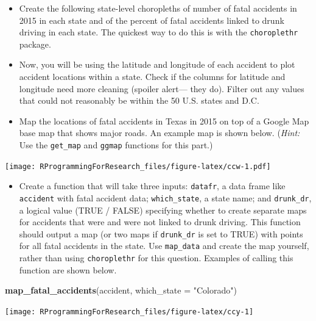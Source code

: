 \documentclass[]{book}
\makeatletter
\newenvironment{Shaded}{\begin{snugshade}}{\end{snugshade}}
\newcommand{\KeywordTok}[1]{\textcolor[rgb]{0.13,0.29,0.53}{\textbf{#1}}}
\newcommand{\DataTypeTok}[1]{\textcolor[rgb]{0.13,0.29,0.53}{#1}}
\newcommand{\StringTok}[1]{\textcolor[rgb]{0.31,0.60,0.02}{#1}}
\newcommand{\NormalTok}[1]{#1}
\providecommand{\tightlist}{%
  \setlength{\itemsep}{0pt}\setlength{\parskip}{0pt}}
\newenvironment{kframe}{%
\medskip{}
\setlength{\fboxsep}{.8em}
 \def\at@end@of@kframe{}%
 \ifinner\ifhmode%
  \def\at@end@of@kframe{\end{minipage}}%
  \begin{minipage}{\columnwidth}%
 \fi\fi%
 \def\FrameCommand##1{\hskip\@totalleftmargin \hskip-\fboxsep
 \colorbox{shadecolor}{##1}\hskip-\fboxsep
     \hskip-\linewidth \hskip-\@totalleftmargin \hskip\columnwidth}%
 \MakeFramed {\advance\hsize-\width
   \@totalleftmargin\z@ \linewidth\hsize
   \@setminipage}}%
 {\par\unskip\endMakeFramed%
 \at@end@of@kframe}
\renewenvironment{Shaded}{\begin{kframe}}{\end{kframe}}
\theoremstyle{definition}
\theoremstyle{definition}
\theoremstyle{definition}
\theoremstyle{remark}
\makeatother
\begin{document}
\begin{itemize}
\item
  Create the following state-level choropleths of number of fatal
  accidents in 2015 in each state and of the percent of fatal accidents
  linked to drunk driving in each state. The quickest way to do this is
  with the \texttt{choroplethr} package.
\item
  Now, you will be using the latitude and longitude of each accident to
  plot accident locations within a state. Check if the columns for
  latitude and longitude need more cleaning (spoiler alert--- they do).
  Filter out any values that could not reasonably be within the 50 U.S.
  states and D.C.
\item
  Map the locations of fatal accidents in Texas in 2015 on top of a
  Google Map base map that shows major roads. An example map is shown
  below. (\emph{Hint:} Use the \texttt{get\_map} and \texttt{ggmap}
  functions for this part.)
\end{itemize}

\texttt{[image: RProgrammingForResearch\_files/figure-latex/ccw-1.pdf]}

\begin{itemize}
\tightlist
\item
  Create a function that will take three inputs: \texttt{datafr}, a data
  frame like \texttt{accident} with fatal accident data;
  \texttt{which\_state}, a state name; and \texttt{drunk\_dr}, a logical
  value (TRUE / FALSE) specifying whether to create separate maps for
  accidents that were and were not linked to drunk driving. This
  function should output a map (or two maps if \texttt{drunk\_dr} is set
  to TRUE) with points for all fatal accidents in the state. Use
  \texttt{map\_data} and create the map yourself, rather than using
  \texttt{choroplethr} for this question. Examples of calling this
  function are shown below.
\end{itemize}

\begin{Shaded}
\begin{Highlighting}[]
\KeywordTok{map_fatal_accidents}\NormalTok{(accident, }\DataTypeTok{which_state =} \StringTok{"Colorado"}\NormalTok{)}
\end{Highlighting}
\end{Shaded}

\begin{center}\texttt{[image: RProgrammingForResearch\_files/figure-latex/ccy-1]} \end{center}
\end{document}
